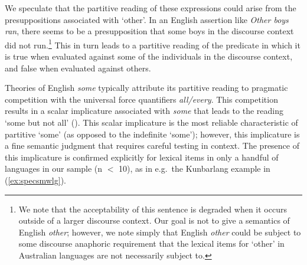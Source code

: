 \documentclass[12pt,egregdoesnotlikesansseriftitles]{scrartcl}
\begin{document}
 We speculate that the partitive reading of these expressions could arise from the presuppositions associated with `other'. In an English assertion like \textit{Other boys ran}, there seems to be a presupposition that some boys in the discourse context did not run.\footnote{We note that the acceptability of this sentence is degraded when it occurs outside of a larger discourse context.  Our goal is not to give a semantics of English \textit{other}; however, we note simply that English \textit{other} could be subject to some discourse anaphoric requirement that the lexical items for `other' in Australian languages are not necessarily subject to.} This in turn leads to a partitive reading of the predicate in which it is true when evaluated against some of the individuals in the discourse context, and false when evaluated against others.



Theories of English \textit{some} typically attribute its partitive reading to pragmatic competition with the universal force quantifiers \textit{all/every}. This competition results in a scalar implicature associated with \textit{some} that leads to the reading `some but not all' (\citealt{horn72}). This scalar implicature is the most reliable characteristic of partitive `some' (as opposed to the indefinite `some'); however, this implicature is a fine semantic judgment that requires careful testing in context. The presence of this implicature is confirmed explicitly  for lexical items in only a handful of languages in our sample (n $<$ 10), as in e.g.\ the Kunbarlang  example in (\ref{ex:specsmwlg}). %
\end{document}

